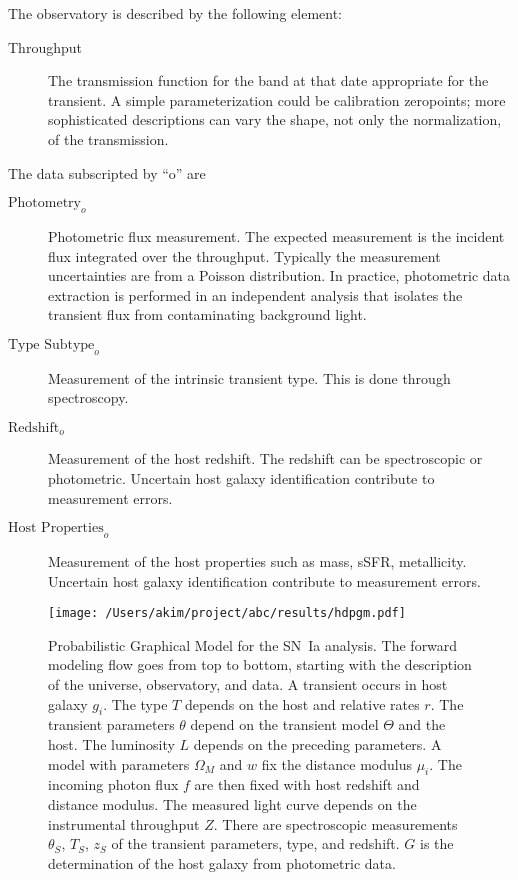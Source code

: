 \documentclass[preprint,3p]{elsarticle}
\begin{document}
The observatory is described by the following element:
\begin{description}
\item[Throughput] The transmission function for the band at that date appropriate
for the transient.  A simple parameterization could be calibration zeropoints; more
sophisticated descriptions can vary the shape, not only the normalization, of the
transmission.
\end{description}
The data subscripted by ``o'' are
\begin{description}
\item[$\text{Photometry}_o$] Photometric flux measurement.  The expected measurement
is the incident flux integrated over the throughput.  Typically the measurement
uncertainties are from a Poisson distribution.  In practice, photometric data extraction
is performed in an independent analysis that isolates the transient flux
from contaminating background light. 
\item[$\text{Type Subtype}_o$] Measurement of the intrinsic transient type.  This is done
through spectroscopy.
\item[$\text{Redshift}_o$] Measurement of the host redshift.  The redshift can be
spectroscopic or photometric.  Uncertain host galaxy identification contribute
to measurement errors.
\item[$\text{Host Properties}_o$] Measurement of the host properties such
as mass, sSFR, metallicity. Uncertain host galaxy identification contribute
to measurement errors.
\end{description}


\begin{figure}[htbp] %
   \centering
   \texttt{[image: /Users/akim/project/abc/results/hdpgm.pdf]} 
   \caption{Probabilistic Graphical Model for the SN~Ia analysis.  
   The forward modeling
   flow goes from top to bottom, starting with the description of the universe, observatory,
   and data.    A transient occurs in host galaxy $g_i$.  The type $T$ depends on the
   host and relative rates $r$.  The transient parameters $\theta$ depend on the
   transient model $\Theta$ and the host.  The luminosity $L$ depends on the preceding
   parameters.  
   A model with parameters $\Omega_M$ and $w$ fix the distance modulus $\mu_i$.
   The 
   incoming photon flux $f$  are then fixed
   with host redshift and distance modulus.
   The measured light curve depends on the instrumental throughput $Z$.  There are
   spectroscopic
   measurements $\theta_S$, $T_S$, $z_S$ of the transient parameters, type, and
   redshift.  $G$ is the determination of the host galaxy from photometric data.
   \label{pgm:fig}}
\end{figure}
\end{document}
